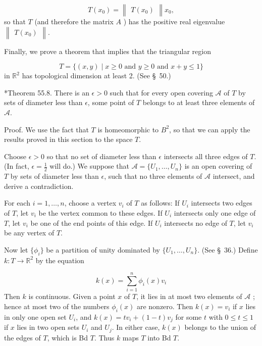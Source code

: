 \[
T( x_{0}) = \begin{Vmatrix}{T( x_{0}) }\end{Vmatrix}x_{0},
\]
so that \(T\) (and therefore the matrix \(A\) ) has the positive real eigenvalue \(\begin{Vmatrix}{T( x_{0}) }\end{Vmatrix}\).

Finally, we prove a theorem that implies that the triangular region

\[
T = \{ ( {x,y}) \mid x \geq 0\text{ and }y \geq 0\text{ and }x + y \leq 1\}
\]
in \(\mathbb{R}^{2}\) has topological dimension at least 2. (See \S\ 50.)

*Theorem 55.8. There is an \(\epsilon > 0\) such that for every open covering \(\mathcal{A}\) of \(T\) by sets of diameter less than \(\epsilon\), some point of \(T\) belongs to at least three elements of \(\mathcal{A}\).

Proof. We use the fact that \(T\) is homeomorphic to \(B^{2}\), so that we can apply the results proved in this section to the space \(T\).

Choose \(\epsilon > 0\) so that no set of diameter less than \(\epsilon\) intersects all three edges of \(T\). (In fact, \(\epsilon = \frac{1}{2}\) will do.) We suppose that \(\mathcal{A} = \{ {U_{1},\ldots ,U_{n}}\}\) is an open covering of \(T\) by sets of diameter less than \(\epsilon\), such that no three elements of \(\mathcal{A}\) intersect, and derive a contradiction.

For each \(i = 1,\ldots, n\), choose a vertex \(v_{i}\) of \(T\) as follows: If \(U_{i}\) intersects two edges of \(T\), let \(v_{i}\) be the vertex common to these edges. If \(U_{i}\) intersects only one edge of \(T\), let \(v_{i}\) be one of the end points of this edge. If \(U_{i}\) intersects no edge of \(T\), let \(v_{i}\) be any vertex of \(T\).

Now let \(\{ {\phi }_{i}\}\) be a partition of unity dominated by \(\{ {U_{1},\ldots ,U_{n}}\}\). (See \S\ 36.) Define \(k : T \rightarrow {\mathbb{R}}^{2}\) by the equation

\[
k(x) = \mathop{\sum }\limits_{{i = 1}}^{n}{\phi }_{i}(x) v_{i}
\]
Then \(k\) is continuous. Given a point \(x\) of \(T\), it lies in at most two elements of \(\mathcal{A}\) ; hence at most two of the numbers \({\phi }_{i}(x)\) are nonzero. Then \(k(x) = v_{i}\) if \(x\) lies in only one open set \(U_{i}\), and \(k(x) = tv_{i} + ( {1 - t}) v_{j}\) for some \(t\) with \(0 \leq t \leq 1\) if \(x\) lies in two open sets \(U_{i}\) and \(U_{j}\). In either case, \(k(x)\) belongs to the union of the edges of \(T\), which is Bd \(T\). Thus \(k\) maps \(T\) into Bd \(T\).

